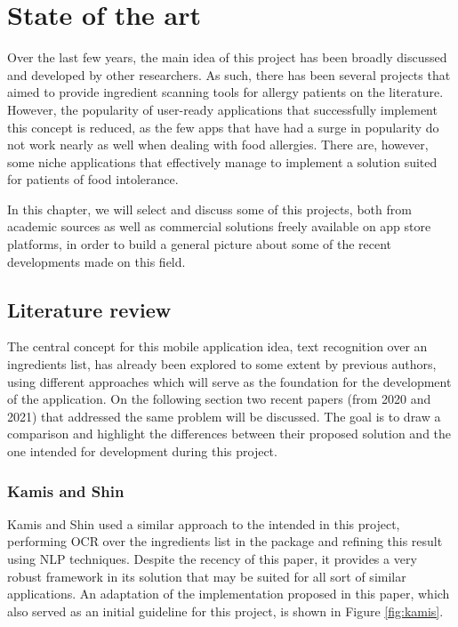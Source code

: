 \chapter{State of the art}
\label{chapter2}

Over the last few years, the main idea of this project has been broadly discussed and developed by other researchers. As such, there has been several projects that aimed to provide ingredient scanning tools for allergy patients on the literature. However, the popularity of user-ready applications that successfully implement this concept is reduced, as the few apps that have had a surge in popularity do not work nearly as well when dealing with food allergies. There are, however, some niche applications that effectively manage to implement a solution suited for patients of food intolerance.

In this chapter, we will select and discuss some of this projects, both from academic sources as well as commercial solutions freely available on app store platforms, in order to build a general picture about some of the recent developments made on this field.

\section{Literature review}

The central concept for this mobile application idea, text recognition over an ingredients list, has already been explored to some extent by previous authors, using different approaches which will serve as the foundation for the development of the application. On the following section two recent papers (from 2020 and 2021) that addressed the same problem will be discussed. The goal is to draw a comparison and highlight the differences between their proposed solution and the one intended for development during this project.

\subsection{Kamis and Shin}

Kamis and Shin \cite{putri_kamis_ocr-based_2020} used a similar approach to the intended in this project, performing OCR over the ingredients list in the package and refining this result using NLP techniques. Despite the recency of this paper, it provides a very robust framework in its solution that may be suited for all sort of similar applications. An adaptation of the implementation proposed in this paper, which also served as an initial guideline for this project, is shown in Figure \ref{fig:kamis}.

